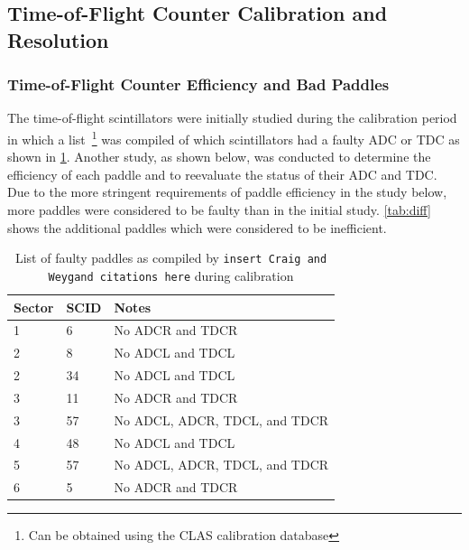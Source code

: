 \subsection{\label{sec:calib.tof}Time-of-Flight Counter Calibration and Resolution}

\subsubsection{\label{sec:calib.tof.eff}Time-of-Flight Counter Efficiency and Bad Paddles}

The time-of-flight scintillators were initially studied during the calibration period in which a list~\footnote{Can be obtained using the CLAS calibration database} was compiled of which scintillators had a faulty ADC or TDC as shown in \ref{tab:craigtof}. Another study, as shown below, was conducted to determine the efficiency of each paddle and to reevaluate the status of their ADC and TDC. Due to the more stringent requirements of paddle efficiency in the study below, more paddles were considered to be faulty than in the initial study. \ref{tab:diff} shows the additional paddles which were considered to be inefficient.

\begin{table}
\begin{tabular}{l|l|p{}} %
Sector & SCID & Notes \\
\hline
1 & 6 & No ADCR and TDCR \\
2 & 8 & No ADCL and TDCL \\
2 & 34 & No ADCL and TDCL \\
3 & 11 & No ADCR and TDCR \\
3 & 57 & No ADCL, ADCR, TDCL, and TDCR \\
4 & 48 & No ADCL and TDCL \\
5 & 57 & No ADCL, ADCR, TDCL, and TDCR \\
6 & 5 & No ADCR and TDCR

\end{tabular}
    \caption{List of faulty paddles as compiled by \texttt{insert Craig and Weygand citations here} during calibration}
    \label{tab:craigtof}
\end{table}


